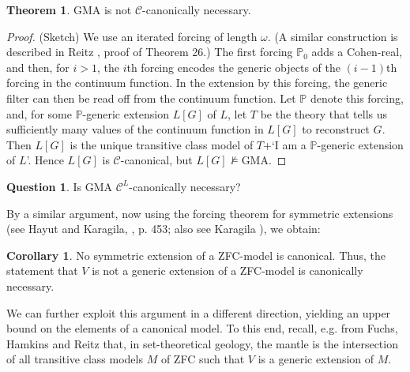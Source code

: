 \documentclass[a4paper,12pt]{amsart}
\theoremstyle{definition}
\newtheorem{thm}[fact]{Theorem}
\newtheorem{corollary}[fact]{Corollary}
\newtheorem{question}[fact]{Question}
\begin{document}
\begin{thm}{\label{gma not c canonical}}
GMA is not $\mathcal{C}$-canonically necessary.
\end{thm}
\begin{proof}
(Sketch) We use an iterated forcing of length $\omega$. (A similar construction is described in Reitz \cite{Reitz}, proof of Theorem 26.) The first forcing $\mathbb{P}_{0}$ adds a Cohen-real, and then, for $i>1$, the $i$th forcing encodes the generic objects of the $(i-1)$th forcing in the continuum function. In the extension by this forcing, the generic filter can then be read off from the continuum function. Let $\mathbb{P}$ denote this forcing, and, for some $\mathbb{P}$-generic extension $L[G]$ of $L$, let $T$ be the theory that tells us sufficiently many values of the continuum function in $L[G]$ to reconstruct $G$. Then $L[G]$ is the unique transitive class model of $T$+`I am a $\mathbb{P}$-generic extension of $L$'. Hence $L[G]$ is $\mathcal{C}$-canonical, but $L[G]\not\models$GMA. 
\end{proof}

\begin{question}
Is GMA $\mathcal{C}^{L}$-canonically necessary?
\end{question}

By a similar argument, now using the forcing theorem for symmetric extensions (see Hayut and Karagila, \cite{HK}, p. 453; also see Karagila \cite{Karagila}), we obtain:

\begin{corollary}{\label{ground model axiom for symmetric models}}
No symmetric extension of a ZFC-model is canonical. Thus, the statement that $V$ is not a generic extension of a ZFC-model is canonically necessary. 
\end{corollary}

We can further exploit this argument in a different direction, yielding an upper bound on the elements of a canonical model. To this end, recall, e.g. from Fuchs, Hamkins and Reitz \cite{FHR} that, in set-theoretical geology, the mantle is the intersection of all transitive class models $M$ of ZFC such that $V$ is a generic extension of $M$. 
\end{document}

